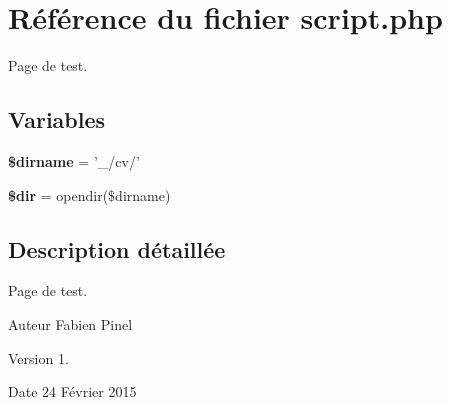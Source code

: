 \hypertarget{script_8php}{\section{Référence du fichier script.\-php}
\label{script_8php}
}


Page de test.  


\subsection*{Variables}
\begin{DoxyCompactItemize}
\item 
\hypertarget{script_8php_a8dcd236cd9d82bd5f2304dca0dfa514a}{{\bfseries \$dirname} = '\-\_\-/cv/'}\label{script_8php_a8dcd236cd9d82bd5f2304dca0dfa514a}

\item 
\hypertarget{script_8php_a1659f0a629d408e0f849dbe4ee061e62}{{\bfseries \$dir} = opendir(\$dirname)}\label{script_8php_a1659f0a629d408e0f849dbe4ee061e62}

\end{DoxyCompactItemize}


\subsection{Description détaillée}
Page de test. \begin{DoxyAuthor}{Auteur}
Fabien Pinel 
\end{DoxyAuthor}
\begin{DoxyVersion}{Version}
1. 
\end{DoxyVersion}
\begin{DoxyDate}{Date}
24 Février 2015 
\end{DoxyDate}
